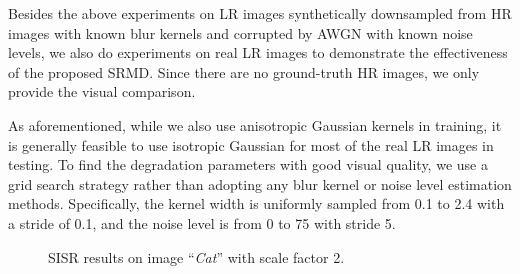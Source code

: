 \documentclass[10pt,twocolumn,letterpaper]{article}
\begin{document}
Besides the above experiments on LR images synthetically downsampled from HR images with known blur kernels and corrupted by AWGN with known noise levels, we also do experiments on real LR images to demonstrate the effectiveness of the proposed SRMD. Since there are no ground-truth HR images, we only provide the visual comparison.


As aforementioned, while we also use anisotropic Gaussian kernels in training, it is generally feasible to use isotropic Gaussian for most of the real LR images in testing. To find the degradation parameters with good visual quality, we use a grid search strategy rather than adopting any blur kernel or noise level estimation methods. Specifically, the kernel width is uniformly sampled from 0.1 to 2.4 with a stride of 0.1, and the noise level is from 0 to 75 with stride 5.


\begin{figure}[!t]%
\begin{center}\vspace{0.2cm}
\caption{SISR results on image ``\emph{Cat}'' with scale factor 2.}\label{fig_real1}
\end{center}\vspace{-0.4cm}
\end{figure}
\end{document}
